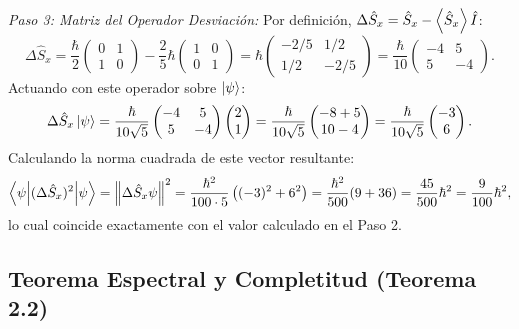 \begin{ejemplobox}
    \textit{Paso 3: Matriz del Operador Desviación:}
    Por definición, $\Delta\hat{S}_x = \hat{S}_x - \left\langle \hat{S}_x \right\rangle\hat{I}$:
    \begin{equation}
        \Delta\hat{S}_x = \frac{\hbar}{2}\begin{pmatrix} 0 & 1 \\ 1 & 0 \end{pmatrix} - \frac{2}{5}\hbar\begin{pmatrix} 1 & 0 \\ 0 & 1 \end{pmatrix} = \hbar \begin{pmatrix} -2/5 & 1/2 \\ 1/2 & -2/5 \end{pmatrix} = \frac{\hbar}{10}\begin{pmatrix} -4 & 5 \\ 5 & -4 \end{pmatrix}.
    \end{equation}
    Actuando con este operador sobre $\left| \psi \right\rangle$:
    \begin{equation}
        \Delta\hat{S}_x \left| \psi \right\rangle = \frac{\hbar}{10\sqrt{5}}\begin{pmatrix} -4 & 5 \\ 5 & -4 \end{pmatrix}\begin{pmatrix} 2 \\ 1 \end{pmatrix} = \frac{\hbar}{10\sqrt{5}}\begin{pmatrix} -8 + 5 \\ 10 - 4 \end{pmatrix} = \frac{\hbar}{10\sqrt{5}}\begin{pmatrix} -3 \\ 6 \end{pmatrix}.
    \end{equation}
    Calculando la norma cuadrada de este vector resultante:
    \begin{equation}
        \left\langle \psi \middle| (\Delta\hat{S}_x)^2 \middle| \psi \right\rangle = \left\| \Delta\hat{S}_x\psi \right\|^2 = \frac{\hbar^2}{100\cdot 5}\left( (-3)^2 + 6^2 \right) = \frac{\hbar^2}{500}(9 + 36) = \frac{45}{500}\hbar^2 = \frac{9}{100}\hbar^2,
    \end{equation}
    lo cual coincide exactamente con el valor calculado en el Paso 2.
\end{ejemplobox}



\subsection{Teorema Espectral y Completitud (Teorema 2.2)}
\label{subsec:teorema_2_2}

